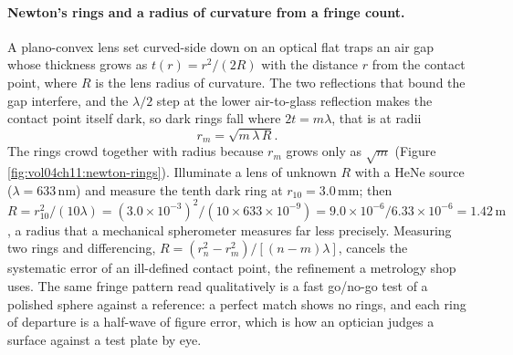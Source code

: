 \paragraph{Newton's rings and a radius of curvature from a fringe count.} A
plano-convex lens set curved-side down on an optical flat traps an air gap whose
thickness grows as $t(r) = r^2/(2R)$ with the distance $r$ from the contact
point, where $R$ is the lens radius of curvature. The two reflections that bound
the gap interfere, and the $\lambda/2$ step at the lower air-to-glass reflection
makes the contact point itself dark, so dark rings fall where
$2t = m\lambda$, that is at radii
\[
r_m = \sqrt{m\,\lambda\,R}.
\]
The rings crowd together with radius because $r_m$ grows only as $\sqrt{m}$
(Figure \ref{fig:vol04ch11:newton-rings}). Illuminate a lens of unknown $R$ with
a HeNe source ($\lambda = 633\,\si{\nano\meter}$) and measure the tenth dark
ring at $r_{10} = 3.0\,\si{\milli\meter}$; then
$R = r_{10}^2/(10\lambda) = (3.0\times 10^{-3})^2/(10\times 633\times 10^{-9}) =
9.0\times 10^{-6}/6.33\times 10^{-6} = 1.42\,\si{\meter}$, a radius that a
mechanical spherometer measures far less precisely. Measuring two rings and
differencing, $R = (r_n^2 - r_m^2)/[(n - m)\lambda]$, cancels the systematic
error of an ill-defined contact point, the refinement a metrology shop uses. The
same fringe pattern read qualitatively is a fast go/no-go test of a polished
sphere against a reference: a perfect match shows no rings, and each ring of
departure is a half-wave of figure error, which is how an optician judges a
surface against a test plate by eye.




